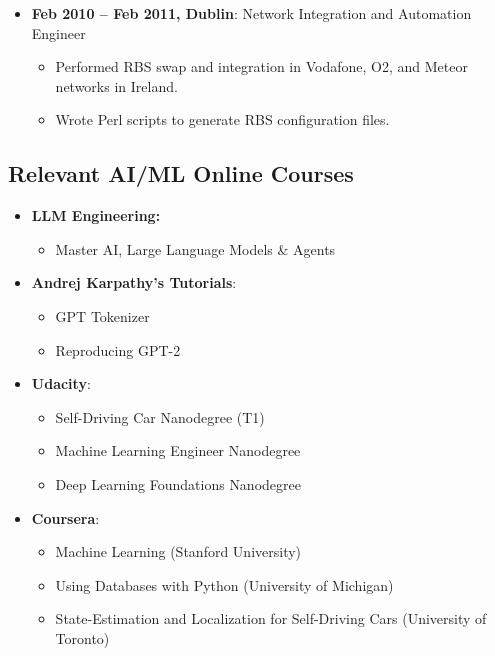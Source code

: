 \documentclass[a4paper,10pt]{article}
\begin{document}
\begin{itemize}
\begin{itemize}
        \item Delivered a successful rollout approach despite developing the procedure without access to test nodes.
    \end{itemize}
    \item \textbf{Feb 2010 -- Feb 2011, Dublin}: Network Integration and Automation Engineer
    \begin{itemize}
        \item Performed RBS swap and integration in Vodafone, O2, and Meteor networks in Ireland.
        \item Wrote Perl scripts to generate RBS configuration files.
    \end{itemize}
\end{itemize}

\subsection*{Relevant AI/ML Online Courses}
\begin{itemize}
    \item \textbf{LLM Engineering:}
    \begin{itemize}
        \item Master AI, Large Language Models \& Agents
    \end{itemize}
    \item \textbf{Andrej Karpathy's Tutorials}:
    \begin{itemize}
        \item GPT Tokenizer
        \item Reproducing GPT-2
    \end{itemize}
    \item \textbf{Udacity}:
    \begin{itemize}
        \item Self-Driving Car Nanodegree (T1)
        \item Machine Learning Engineer Nanodegree
        \item Deep Learning Foundations Nanodegree
    \end{itemize}
    \item \textbf{Coursera}:
    \begin{itemize}
        \item Machine Learning (Stanford University)
        \item Using Databases with Python (University of Michigan)
        \item State-Estimation and Localization for Self-Driving Cars (University of Toronto)
    \end{itemize}
\end{itemize}
\end{document}
